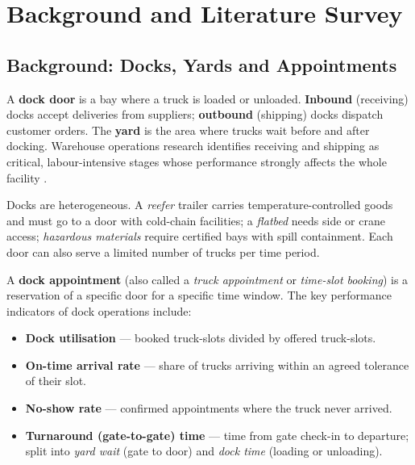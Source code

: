 \chapter{Background and Literature Survey}

\section{Background: Docks, Yards and Appointments}
A \textbf{dock door} is a bay where a truck is loaded or unloaded. \textbf{Inbound} (receiving) docks accept deliveries from suppliers; \textbf{outbound} (shipping) docks dispatch customer orders. The \textbf{yard} is the area where trucks wait before and after docking. Warehouse operations research identifies receiving and shipping as critical, labour-intensive stages whose performance strongly affects the whole facility \cite{gu2007}.

Docks are heterogeneous. A \emph{reefer} trailer carries temperature-controlled goods and must go to a door with cold-chain facilities; a \emph{flatbed} needs side or crane access; \emph{hazardous materials} require certified bays with spill containment. Each door can also serve a limited number of trucks per time period.

A \textbf{dock appointment} (also called a \emph{truck appointment} or \emph{time-slot booking}) is a reservation of a specific door for a specific time window. The key performance indicators of dock operations include:

\begin{itemize}
  \item \textbf{Dock utilisation} --- booked truck-slots divided by offered truck-slots.
  \item \textbf{On-time arrival rate} --- share of trucks arriving within an agreed tolerance of their slot.
  \item \textbf{No-show rate} --- confirmed appointments where the truck never arrived.
  \item \textbf{Turnaround (gate-to-gate) time} --- time from gate check-in to departure; split into \emph{yard wait} (gate to door) and \emph{dock time} (loading or unloading).
\end{itemize}

